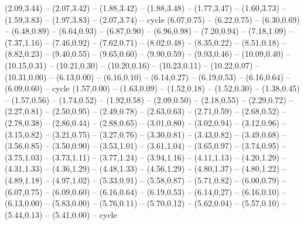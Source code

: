 \expandafter\def\csname geo:gebiet:1945-SaarProtectorate\endcsname{
  (2.09,3.44) -- (2.07,3.42) -- (1.88,3.42) -- (1.88,3.48) -- (1.77,3.47) -- (1.60,3.73) -- (1.59,3.83) -- (1.97,3.83) -- (2.07,3.74) -- cycle}
\expandafter\def\csname geo:gebiet:1945-Yugoslavia\endcsname{
  (6.07,0.75) -- (6.22,0.75) -- (6.30,0.69) -- (6.48,0.89) -- (6.64,0.93) -- (6.87,0.90) -- (6.96,0.98) -- (7.20,0.94) -- (7.18,1.09) -- (7.37,1.16) -- (7.46,0.92) -- (7.62,0.71) -- (8.02,0.48) -- (8.35,0.22) -- (8.51,0.18) -- (8.82,0.23) -- (9.40,0.55) -- (9.65,0.60) -- (9.90,0.59) -- (9.93,0.46) -- (10.09,0.40) -- (10.15,0.31) -- (10.21,0.30) -- (10.20,0.16) -- (10.23,0.11) -- (10.22,0.07) -- (10.31,0.00) -- (6.13,0.00) -- (6.16,0.10) -- (6.14,0.27) -- (6.19,0.53) -- (6.16,0.64) -- (6.09,0.60) -- cycle}
\expandafter\def\csname geo:gebiet:1945-Italy\endcsname{
  (1.57,0.00) -- (1.63,0.09) -- (1.52,0.18) -- (1.52,0.30) -- (1.38,0.45) -- (1.57,0.56) -- (1.74,0.52) -- (1.92,0.58) -- (2.09,0.50) -- (2.18,0.55) -- (2.29,0.72) -- (2.27,0.81) -- (2.50,0.95) -- (2.49,0.78) -- (2.63,0.63) -- (2.71,0.59) -- (2.68,0.52) -- (2.78,0.38) -- (2.86,0.44) -- (2.88,0.65) -- (3.01,0.80) -- (3.02,0.94) -- (3.12,0.96) -- (3.15,0.82) -- (3.21,0.75) -- (3.27,0.76) -- (3.30,0.81) -- (3.43,0.82) -- (3.49,0.68) -- (3.56,0.85) -- (3.50,0.90) -- (3.53,1.01) -- (3.61,1.04) -- (3.65,0.97) -- (3.74,0.95) -- (3.75,1.03) -- (3.73,1.11) -- (3.77,1.24) -- (3.94,1.16) -- (4.11,1.13) -- (4.20,1.29) -- (4.31,1.33) -- (4.36,1.29) -- (4.48,1.33) -- (4.56,1.29) -- (4.80,1.37) -- (4.80,1.22) -- (4.89,1.18) -- (4.97,1.02) -- (5.33,0.91) -- (5.58,0.87) -- (5.71,0.82) -- (6.00,0.79) -- (6.07,0.75) -- (6.09,0.60) -- (6.16,0.64) -- (6.19,0.53) -- (6.14,0.27) -- (6.16,0.10) -- (6.13,0.00) -- (5.83,0.00) -- (5.76,0.11) -- (5.70,0.12) -- (5.62,0.04) -- (5.57,0.10) -- (5.44,0.13) -- (5.41,0.00) -- cycle}
